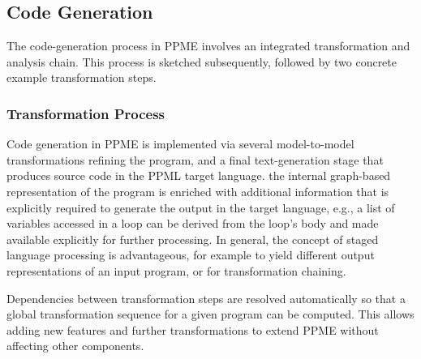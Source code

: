 \subsection{Code Generation}
The code-generation process in PPME involves an integrated transformation and analysis chain. This process is
sketched subsequently, followed by two concrete example transformation steps.

\subsubsection{Transformation Process}
Code generation in PPME is implemented via several model-to-model transformations
refining the program, and a final text-generation stage that produces source code in
the PPML target language. 
%
%
 the internal graph-based representation of the program is
enriched with additional information that is explicitly required to generate the
output in the target language, e.g., a list of variables accessed in a loop can be
derived from the loop's body and made available explicitly for further processing. In
general, the concept of staged language processing is advantageous, for example to yield
different output representations of an input program, or for transformation chaining.
%

Dependencies between transformation steps are resolved automatically so that a global
transformation sequence for a given program can be computed. This allows adding new
features and further transformations to extend PPME without affecting
other components.

